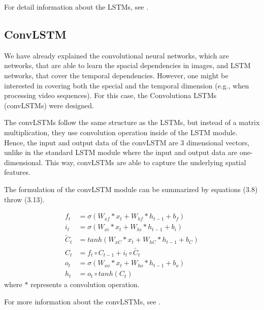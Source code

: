 For detail information about the LSTMs, see \cite{LSTM_blog}. 


\subsection{ConvLSTM}\label{tb:convLstm}
We have already explained the convolutional neural networks, which are networks, that are able to learn the spacial dependencies in images, and LSTM networks, that cover the temporal dependencies. However, one might be interested in covering both the special and the temporal dimension (e.g., when processing video sequences). For this case, the Convolutiona LSTMs (convLSTMs) were designed. 

The convLSTMs follow the same structure as the LSTMs, but instead of a matrix multiplication, they use convolution operation inside of the LSTM module. Hence, the input and output data of the convLSTM are 3 dimensional vectors, unlike in the standard LSTM module where the input and output data are one-dimensional. This way, convLSTMs are able to capture the underlying spatial features. 

The formulation of the convLSTM module can be summarized by equations (3.8) throw (3.13). 

\begin{align}
    f_t &=\sigma(W_{xf}* x_t + W_{hf}* h_{t-1} +b_f)\\
    i_t &=\sigma(W_{xi} * x_t + W_{hi} * h_{t-1} +b_i)\\
    \widetilde{C}_t&=tanh(W_{xC}* x_t + W_{hC} * h_{t-1} +b_C)\\
    C_t&=f_t\circ C_{t-1}+i_t\circ \widetilde{C_t}\\
    o_t&=\sigma(W_{xo} * x_t + W_{ho} * h_{t-1} +b_o)\\
    h_t&=o_t\circ tanh(C_t)
\end{align}
where $*$ represents a convolution operation.

For more information about the convLSTMs, see \cite{convLSTM}.

